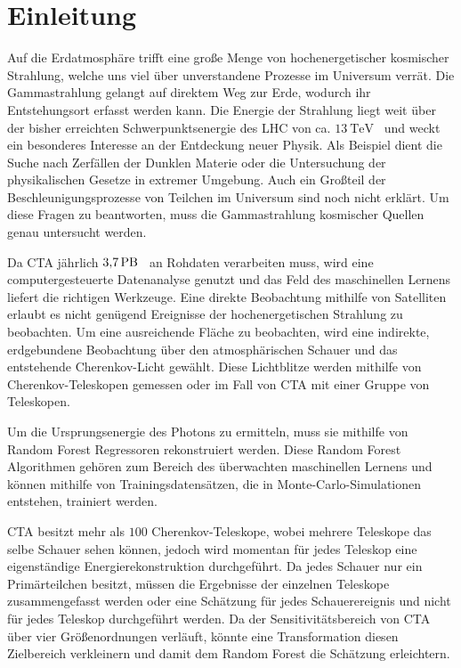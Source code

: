 \chapter{Einleitung}

Auf die Erdatmosphäre trifft eine große Menge von hochenergetischer kosmischer Strahlung, welche uns viel über unverstandene
Prozesse im Universum verrät.
Die Gammastrahlung gelangt auf direktem Weg zur Erde, wodurch ihr Entstehungsort erfasst werden kann.
Die Energie der Strahlung liegt weit über der bisher erreichten Schwerpunktsenergie des LHC von ca. $\SI{13}{\tera\eV}$~\cite{LHC} und weckt
ein besonderes Interesse an der Entdeckung neuer Physik.
Als Beispiel dient die Suche nach Zerfällen der Dunklen Materie oder die Untersuchung der physikalischen Gesetze in extremer Umgebung.
Auch ein Großteil der Beschleunigungsprozesse von Teilchen im Universum sind noch nicht erklärt.
Um diese Fragen zu beantworten, muss die Gammastrahlung kosmischer Quellen genau untersucht werden.

Da CTA jährlich $\SI{3.7}{\peta\byte}$~\cite{Rohdaten} an Rohdaten verarbeiten muss, wird eine computergesteuerte Datenanalyse
genutzt und das Feld des maschinellen Lernens liefert die richtigen Werkzeuge.
Eine direkte Beobachtung mithilfe von Satelliten erlaubt es nicht genügend Ereignisse der hochenergetischen Strahlung zu beobachten.
Um eine ausreichende Fläche zu beobachten, wird eine indirekte, erdgebundene Beobachtung über den atmosphärischen Schauer und das
entstehende Cherenkov-Licht gewählt.
Diese Lichtblitze werden mithilfe von Cherenkov-Teleskopen gemessen oder im Fall von CTA mit einer Gruppe von Teleskopen.

Um die Ursprungsenergie des Photons zu ermitteln, muss sie mithilfe von Random Forest Regressoren rekonstruiert werden.
Diese Random Forest Algorithmen gehören zum Bereich des überwachten maschinellen Lernens und können mithilfe von Trainingsdatensätzen,
die in Monte-Carlo-Simulationen entstehen, trainiert werden.

CTA besitzt mehr als $\num{100}$ Cherenkov-Teleskope, wobei mehrere Teleskope das selbe Schauer sehen können, jedoch wird momentan für jedes Teleskop eine eigenständige
Energierekonstruktion durchgeführt.
Da jedes Schauer nur ein Primärteilchen besitzt, müssen die Ergebnisse der einzelnen Teleskope zusammengefasst werden oder
eine Schätzung für jedes Schauerereignis und nicht für jedes Teleskop durchgeführt werden.
Da der Sensitivitätsbereich von CTA über vier Größenordnungen verläuft, könnte eine Transformation diesen Zielbereich verkleinern und
damit dem Random Forest die Schätzung erleichtern.
